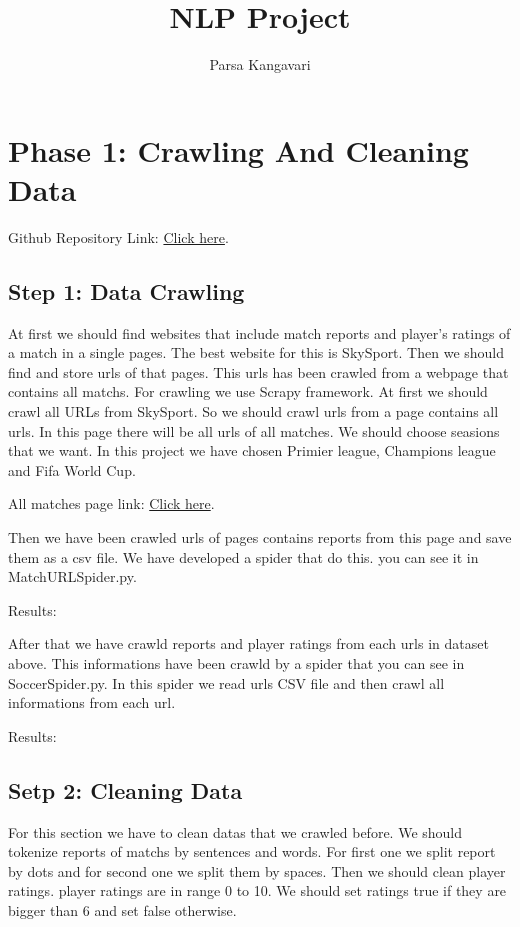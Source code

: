 \documentclass{article}
\title{NLP Project}
\author{Parsa Kangavari}
\begin{document}
 
\maketitle

\section{Phase 1: Crawling And Cleaning Data}
Github Repository Link: \href{https://github.com/rezakongo/soccer_report_analyst}{Click here}.


\subsection{Step 1: Data Crawling}
At first we should find websites that include match reports and player's ratings of a match in a single pages. The best website for this is SkySport.
Then we should find and store urls of that pages. This urls has been crawled from a webpage that contains all matchs. For crawling we use Scrapy framework.
At first we should crawl all URLs from SkySport. So we should crawl urls from a page contains all urls. In this page there will be all urls of all matches.
We should choose seasions that we want. In this project we have chosen Primier league, Champions league and Fifa World Cup.

All matches page link: \href{https://www.skysports.com/premier-league-results}{Click here}.


Then we have been crawled urls of pages contains reports from this page and save them as a csv file. We have developed a spider that do this. you can see it in MatchURLSpider.py.

Results:
\begin{center}
\end{center}


After that we have crawld reports and player ratings from each urls in dataset above. This informations have been crawld by a spider that you can see in SoccerSpider.py.
In this spider we read urls CSV file and then crawl all informations from each url.

Results: 
\begin{center}
\end{center}

\subsection{Setp 2: Cleaning Data}
For this section we have to clean datas that we crawled before. We should tokenize reports of matchs by sentences and words. 
For first one we split report by dots and for second one we split them by spaces. Then we should clean player ratings. player ratings are in range 0 to 10.
We should set ratings true if they are bigger than 6 and set false otherwise.
\end{document}
